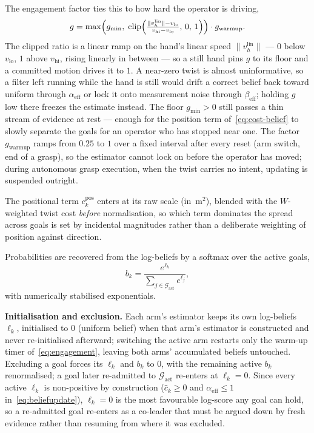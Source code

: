 \documentclass[12pt,a4paper,twoside,openright]{report}
\begin{document}
The engagement factor ties this to how hard the operator is driving,
\begin{equation}
g = \max\Bigl(g_{\min},\; \operatorname{clip}\Bigl(\tfrac{\|v_h^{\text{lin}}\| - v_{\text{lo}}}{v_{\text{hi}} - v_{\text{lo}}},\,0,\,1\Bigr)\Bigr)\cdot g_{\text{warmup}}.
\label{eq:engagement}
\end{equation}
The clipped ratio is a linear ramp on the hand's linear speed $\|v_h^{\text{lin}}\|$ --- $0$ below $v_{\text{lo}}$, $1$ above $v_{\text{hi}}$, rising linearly in between --- so a still hand pins $g$ to its floor and a committed motion drives it to $1$. A near-zero twist is almost uninformative, so a filter left running while the hand is still would drift a correct belief back toward uniform through $\alpha_{\text{eff}}$ or lock it onto measurement noise through $\beta_{\text{eff}}$; holding $g$ low there freezes the estimate instead. The floor $g_{\min} > 0$ still passes a thin stream of evidence at rest --- enough for the position term of~\eqref{eq:cost-belief} to slowly separate the goals for an operator who has stopped near one. The factor $g_{\text{warmup}}$ ramps from $0.25$ to $1$ over a fixed interval after every reset (arm switch, end of a grasp), so the estimator cannot lock on before the operator has moved; during autonomous grasp execution, when the twist carries no intent, updating is suspended outright.

The positional term $c_k^{\text{pos}}$ enters at its raw scale (in~$\text{m}^2$), blended with the $W$-weighted twist cost \emph{before} normalisation, so which term dominates the spread across goals is set by incidental magnitudes rather than a deliberate weighting of position against direction.

Probabilities are recovered from the log-beliefs by a softmax over the active goals,
\begin{equation}
b_k = \frac{e^{\ell_k}}{\sum_{j \in \mathcal{G}_{\text{act}}} e^{\ell_j}},
\label{eq:beliefnorm}
\end{equation}
with numerically stabilised exponentials.

\textbf{Initialisation and exclusion.} Each arm's estimator keeps its own log-beliefs $\ell_k$, initialised to $0$ (uniform belief) when that arm's estimator is constructed and never re-initialised afterward; switching the active arm restarts only the warm-up timer of~\eqref{eq:engagement}, leaving both arms' accumulated beliefs untouched. Excluding a goal forces its $\ell_k$ and $b_k$ to $0$, with the remaining active $b_k$ renormalised; a goal later re-admitted to $\mathcal{G}_{\text{act}}$ re-enters at $\ell_k = 0$. Since every active $\ell_k$ is non-positive by construction ($\hat{c}_k \ge 0$ and $\alpha_{\text{eff}} \le 1$ in~\eqref{eq:beliefupdate}), $\ell_k = 0$ is the most favourable log-score any goal can hold, so a re-admitted goal re-enters as a co-leader that must be argued down by fresh evidence rather than resuming from where it was excluded.
\end{document}
